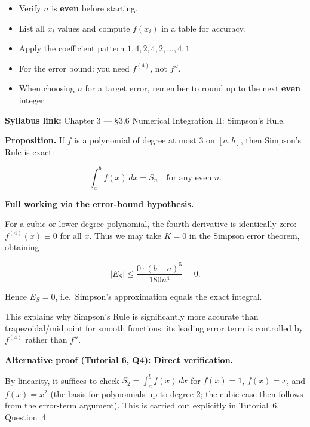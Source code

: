 \begin{examtip}[title={Exam Focus: Simpson's Rule computation checklist}]
\begin{itemize}[leftmargin=*]
\item Verify $n$ is \textbf{even} before starting.
\item List all $x_i$ values and compute $f(x_i)$ in a table for accuracy.
\item Apply the coefficient pattern $1,4,2,4,2,\ldots,4,1$.
\item For the error bound: you need $f^{(4)}$, not $f''$.
\item When choosing $n$ for a target error, remember to round up to the next \textbf{even} integer.
\end{itemize}
\end{examtip}

\begin{extension}[title={Extension (Beyond Syllabus: Simpson is exact for cubics)}]

\textbf{Syllabus link:} Chapter 3 — \S3.6 Numerical Integration II: Simpson's Rule.

\textbf{Proposition.} If $f$ is a polynomial of degree at most $3$ on $[a,b]$, then Simpson's Rule is exact:

\[
\int_a^b f(x)\,dx = S_n\quad\text{for any even }n.
\]

\textbf{Full working via the error-bound hypothesis.}

For a cubic or lower-degree polynomial, the fourth derivative is identically zero: $f^{(4)}(x)\equiv 0$ for all $x$. Thus we may take $K=0$ in the Simpson error theorem, obtaining

\[
|E_S| \le \frac{0\cdot(b-a)^5}{180n^4}=0.
\]

Hence $E_S=0$, i.e.\ Simpson's approximation equals the exact integral.

This explains why Simpson's Rule is significantly more accurate than trapezoidal/midpoint for smooth functions: its leading error term is controlled by $f^{(4)}$ rather than $f''$.

\textbf{Alternative proof (Tutorial 6, Q4): Direct verification.}

By linearity, it suffices to check $S_2 = \int_a^b f(x)\,dx$ for $f(x)=1$, $f(x)=x$, and $f(x)=x^2$ (the basis for polynomials up to degree 2; the cubic case then follows from the error-term argument). This is carried out explicitly in Tutorial~6, Question~4.

\end{extension}

